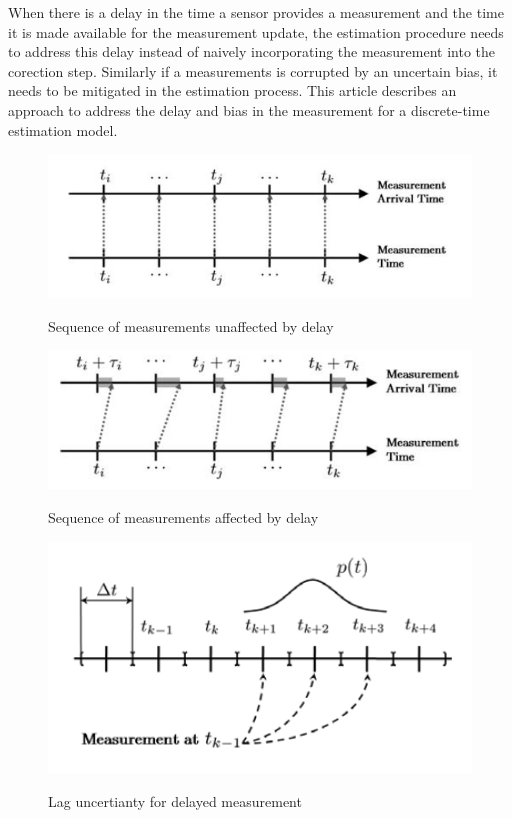 When there is a delay in the time a sensor provides a measurement and the time it is made available for the measurement update, the estimation procedure needs to address this delay instead of naively incorporating the measurement into the corection step.
Similarly if a measurements is corrupted by an uncertain bias, it needs to be mitigated in the estimation process.
This article describes an approach to address the delay and bias in the measurement for a discrete-time estimation model.

\begin{figure}
	{\includegraphics[width=1.0\columnwidth]{./img/undelayed_measurement.png}}
	\caption{Sequence of measurements unaffected by delay}
	\label{fig:undelayed_measurement}
\end{figure} 

\begin{figure}
	{\includegraphics[width=1.0\columnwidth]{./img/delayed_measurement.png}}
	\caption{Sequence of measurements affected by delay}
	\label{fig:delayed_measurement}
\end{figure} 

\begin{figure}
	{\includegraphics[width=1.0\columnwidth]{./img/delay_uncertainty.png}}
	\caption{Lag uncertianty for delayed measurement}
	\label{fig:delay_uncertainty}
\end{figure} 
 